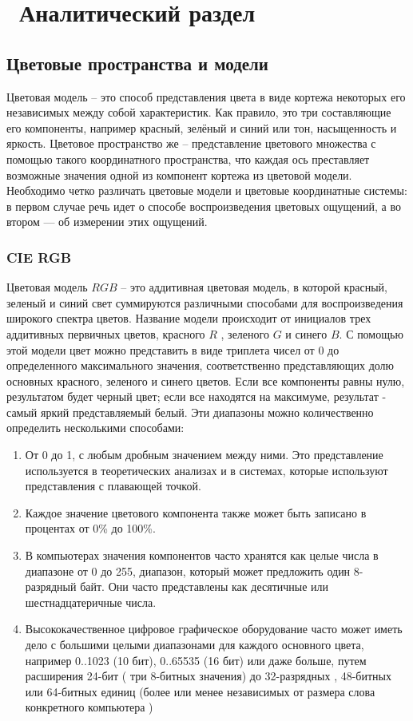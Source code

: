 \chapter{ Аналитический раздел}
\label{cha:analysis}


\section {Цветовые пространства и модели}
Цветовая модель -- это способ представления цвета в виде кортежа некоторых его независимых между собой характеристик. Как правило, это три составляющие его компоненты, например красный, зелёный и синий или тон, насыщенность и яркость. Цветовое пространство же -- представление цветового множества с помощью такого координатного пространства, что каждая ось преставляет возможные значения одной из компонент кортежа из цветовой модели. Необходимо четко различать цветовые модели и цветовые координатные системы: в первом случае речь идет о способе воспроизведения цветовых ощущений, а во втором — об измерении этих ощущений.

\subsection{CIE RGB}
Цветовая модель $RGB$ -- это аддитивная цветовая модель, в которой красный, зеленый и синий свет суммируются различными способами для воспроизведения широкого спектра цветов. Название модели происходит от инициалов трех аддитивных первичных цветов, красного $R$ , зеленого $G$ и синего $B$.
С помощью этой модели цвет можно представить в виде триплета чисел от 0 до определенного максимального значения, соответственно представляющих долю основных красного, зеленого и синего цветов. Если все компоненты равны нулю, результатом будет черный цвет; если все находятся на максимуме, результат - самый яркий представляемый белый.
Эти диапазоны можно количественно определить несколькими способами:
\begin{enumerate}
	\item От 0 до 1, с любым дробным значением между ними. Это представление используется в теоретических анализах и в системах, которые используют представления с плавающей точкой.
	\item Каждое значение цветового компонента также может быть записано в процентах от 0\% до 100\%.
	\item В компьютерах значения компонентов часто хранятся как целые числа в диапазоне от 0 до 255, диапазон, который может предложить один 8-разрядный байт. Они часто представлены как десятичные или шестнадцатеричные числа.
	\item Высококачественное цифровое графическое оборудование часто может иметь дело с большими целыми диапазонами для каждого основного цвета, например 0..1023 (10 бит), 0..65535 (16 бит) или даже больше, путем расширения 24-бит ( три 8-битных значения) до 32-разрядных , 48-битных или 64-битных единиц (более или менее независимых от размера слова конкретного компьютера )
\end{enumerate}	

